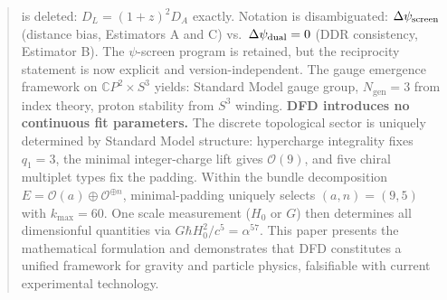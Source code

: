 \documentclass[aps,prd,twocolumn,superscriptaddress,showpacs,floatfix,nofootinbib]{revtex4-2}
\theoremstyle{plain}
\theoremstyle{definition}
\theoremstyle{remark}
\begin{document}
\begin{abstract}
is deleted: $D_L = (1+z)^2 D_A$ exactly. Notation is disambiguated: $\Delta\psi_{\rm screen}$
(distance bias, Estimators A and C) vs.\ $\Delta\psi_{\rm dual} = 0$ (DDR consistency, Estimator B).
The $\psi$-screen program is retained, but the reciprocity statement is now explicit and version-independent.
%
The gauge emergence framework on $\mathbb{C}P^2 \times S^3$ yields: Standard Model gauge group, 
$N_{\text{gen}} = 3$ from index theory, proton stability from $S^3$ winding.
%
\textbf{DFD introduces no continuous fit parameters.} The discrete topological sector is uniquely 
determined by Standard Model structure: hypercharge integrality fixes $q_1 = 3$, 
the minimal integer-charge lift gives $\mathcal{O}(9)$, and five chiral multiplet types fix the padding. 
Within the bundle decomposition $E = \mathcal{O}(a) \oplus \mathcal{O}^{\oplus n}$, minimal-padding uniquely selects 
$(a,n) = (9,5)$ with $k_{\max} = 60$. One scale measurement ($H_0$ or $G$) then determines all 
dimensionful quantities via $G\hbar H_0^2/c^5 = \alpha^{57}$.
This paper presents the mathematical formulation and demonstrates that 
DFD constitutes a unified framework for gravity and particle physics, falsifiable with 
current experimental technology.
\end{abstract}

\maketitle
\tableofcontents








\end{document}
